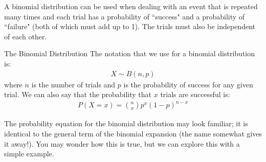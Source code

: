 A binomial distribution can be used when dealing with an event that is repeated many times and each trial has a probability of ``success" and a probability of ``failure" (both of which must add up to 1). The trials must also be independent of each other.
\begin{theorem}{The Binomial Distribution}
The notation that we use for a binomial distribution is:
\begin{align}
    X \sim B(n, p)
\end{align}
where $n$ is the number of trials and $p$ is the probability of success for any given trial. We can also say that the probability that $x$ trials are successful is:
\begin{align}
    P(X=x) = \binom{n}{x}p^x(1-p)^{n-x}
\end{align}
\end{theorem}

The probability equation for the binomial distribution may look familiar; it is identical to the general term of the binomial expansion (the name somewhat gives it away!). You may wonder how this is true, but we can explore this with a simple example.

